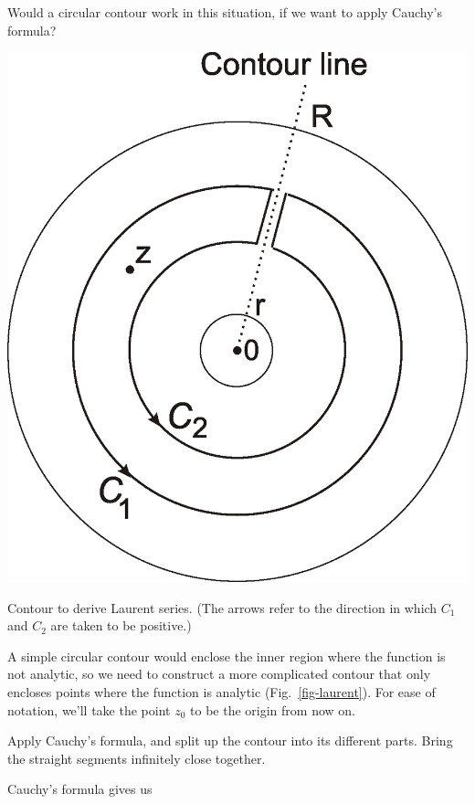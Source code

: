 \begin{cue}
Would a circular contour work in this situation, if we want to apply Cauchy's formula?
\end{cue}

\begin{marginfigure}
\includegraphics{complex/figures/laurent}
\caption{Contour to derive Laurent series. (The arrows refer to the direction in which $C_1$ and $C_2$ are taken to be positive.)}
\label{fig-laurent}
\end{marginfigure}

A simple circular contour would enclose the inner region where the function is not analytic, so we need to construct a more complicated contour that only encloses points where the function is analytic (Fig.~\ref{fig-laurent}). For ease of notation, we'll take the point $z_0$ to be the origin from now on.

\begin{cue}
Apply Cauchy's formula, and split up the contour into its different parts. Bring the straight segments infinitely close together.
\end{cue}

Cauchy's formula gives us

